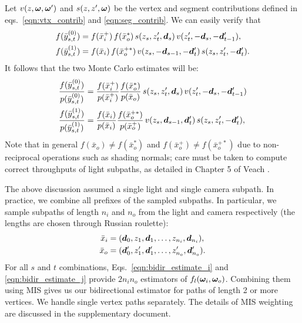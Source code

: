 Let $v(z, \bm{\omega}, \bm{\omega}')$ and $s(z, z', \bm{\omega})$ be the vertex and segment contributions defined in eqs.~\eqref{eqn:vtx_contrib} and \eqref{eqn:seg_contrib}.
We can easily verify that
%
\begin{align}
f(\bar{y}_{s,t}^{(0)}) &= f(\bar{x}_i^+) \, f(\bar{x}_o^*) \, s(z_s, z'_t, \bm{d}_s) \, v(z'_t, -\bm{d}_s, -\bm{d}'_{t - 1}),\\
f(\bar{y}_{s,t}^{(1)}) &= f(\bar{x}_i) \, f(\bar{x}_o^{+*}) \, v(z_s, -\bm{d}_{s - 1}, -\bm{d}'_t) \, s(z_s, z'_t, -\bm{d}'_t).
\end{align}
%
It follows that the two Monte Carlo estimates will be:
%
\begin{align}
\label{eqn:bidir_estimate_i}
\frac{f(\bar{y}^{(0)}_{s, t})}{p(\bar{y}^{(0)}_{s, t})} &=
\frac{f(\bar{x}_i^+)}{p(\bar{x}_i^+)}
\frac{f(\bar{x}_o^*)}{p(\bar{x}_o)}
\, s(z_s, z'_t, \bd_s) \, v(z'_t, -\bd_s, -\bd'_{t - 1})\\
%
\label{eqn:bidir_estimate_j}
\frac{f(\bar{y}^{(1)}_{s, t})}{p(\bar{y}^{(1)}_{s, t})} &=
\frac{f(\bar{x}_i)}{p(\bar{x}_i)}
\frac{f(\bar{x}_o^{+*})}{p(\bar{x}_o^+)}
\, v(z_s, \bd_{s - 1}, \bd'_t) \, s(z_s, z'_t, -\bd'_t),
\end{align}
Note that in general $f(\bar x_o) \neq f(\bar x_o^*)$ and $f(\bar x_o^+) \neq f(\bar x_o^{+*})$ due to non-reciprocal operations such as shading normals; care must be taken to compute correct throughputs of light subpaths, as detailed in Chapter 5 of Veach .

The above discussion assumed a single light and single camera subpath. In practice, we combine all prefixes of the sampled subpaths. In particular, we sample subpaths of length $n_i$ and $n_o$ from the light and camera respectively (the lengths are chosen through Russian roulette):
\begin{equation}
\begin{aligned}
\bar{x}_i &= (\bm{d}_0, z_1, \bm{d}_1, \ldots, z_{n_i}, \bm{d}_{n_i}),\\
\bar{x}_o &= (\bm{d}'_0, z'_1, \bm{d}'_1, \ldots, z'_{n_o}, \bm{d}'_{n_o}).
\end{aligned}
\end{equation}
For all $s$ and $t$ combinations, Eqs.~\eqref{eqn:bidir_estimate_i} and \eqref{eqn:bidir_estimate_j} provide $2 n_i n_o$ estimators of $f_l(\bm{\omega}_i, \bm{\omega}_o)$.
Combining them using MIS gives us our bidirectional estimator for paths of length 2 or more vertices. We handle single vertex paths separately. The details of MIS weighting are discussed in the supplementary document.


